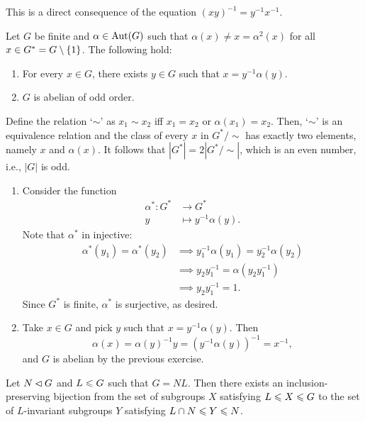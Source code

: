 \begin{solution} This is a direct consequence of the equation $(xy)^{-1}=y^{-1}x^{-1}$.  \end{solution}

\begin{exr}
    Let\/ $G$ be finite and\/ $\alpha \in {\rm Aut}(G)$ such that\/ $\alpha(x) \neq x = \alpha^2(x)$ for all\/ $x \in G^* = G\setminus\{1\}$. The following hold:
    \begin{enumerate}[\rm a)]
        \item For every\/ $x \in G$, there exists\/ $y \in G$ such that\/ $x = y^{-1}\alpha(y)$.
        \item $G$ is abelian of odd order.
    \end{enumerate}
\end{exr}

\begin{solution}
Define the relation `$\sim$' as $x_1\sim x_2$ iff $x_1=x_2$ or $\alpha(x_1)=x_2$. Then, `$\sim$' is an equivalence relation and the class of every $x$ in $G^*\!/{\sim}$ has exactly two elements, namely $x$ and $\alpha(x)$. It follows that $|G^*|=2|G^*\!/{\sim}|$, which is an even number, i.e., $|G|$ is odd.

\begin{enumerate}[\rm a)]
    \item Consider the function
    \begin{align*}
        \alpha^*\colon G^*&\to G^*\\
        y&\mapsto y^{-1}\alpha(y).
    \end{align*}
    Note that $\alpha^*$ in injective:
    \begin{align*}
        \alpha^*(y_1)=\alpha^*(y_2)
            &\implies y_1^{-1}\alpha(y_1)=y_2^{-1}\alpha(y_2)\\
            &\implies y_2y_1^{-1}=\alpha(y_2y_1^{-1})\\
            &\implies y_2y_1^{-1}=1.
    \end{align*}
    Since $G^*$ is finite, $\alpha^*$ is surjective, as desired.

    \item Take $x\in G$ and pick $y$ such that $x=y^{-1}\alpha(y)$. Then
    $$
        \alpha(x) = \alpha(y)^{-1}y=(y^{-1}\alpha(y))^{-1}=x^{-1},
    $$
    and $G$ is abelian by the previous exercise.
\end{enumerate}
\end{solution}

\begin{exr}
    Let\/ $N\lhd G$ and\/ $L\leqslant G$ such that\/ $G = NL$. Then there exists an inclusion-preserving bijection from the set of subgroups\/ $X$ satisfying\/ $L\leqslant X\leqslant G$ to the set of\/ $L$-invariant subgroups\/ $Y$ satisfying\/ $L\cap N\leqslant Y\leqslant N$.
\end{exr}


